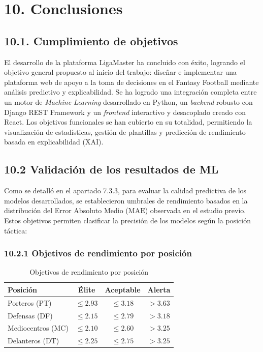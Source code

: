 \section*{10. Conclusiones}
\subsection{10.1. Cumplimiento de objetivos}

El desarrollo de la plataforma LigaMaster ha concluido con éxito,
 logrando el objetivo general propuesto al inicio del trabajo: diseñar
  e implementar una plataforma web de apoyo a la toma de decisiones en
   el Fantasy Football mediante análisis predictivo y explicabilidad. 
   Se ha logrado una integración completa entre un motor de \textit{Machine Learning}
    desarrollado en Python, un \textit{backend} robusto con Django REST Framework y
     un \textit{frontend} interactivo y desacoplado creado con React. Los objetivos 
     funcionales se han cubierto en su totalidad, permitiendo la visualización de estadísticas,
      gestión de plantillas y predicción de rendimiento basada en explicabilidad (XAI).


\subsection{10.2 Validación de los resultados de ML}

Como se detalló en el apartado 7.3.3, para evaluar la calidad 
predictiva de los modelos desarrollados, se establecieron umbrales 
de rendimiento basados en la distribución del Error Absoluto Medio 
($\mathrm{MAE}$) observada en el estudio previo. Estos objetivos 
permiten clasificar la precisión de los modelos según la posición 
táctica:


\subsubsection{10.2.1 Objetivos de rendimiento por posición}

\begin{table}[H]
\centering
\small
\begin{tabular}{|l|c|c|c|}
\hline
\textbf{Posición} & \textbf{Élite} & \textbf{Aceptable} & 
\textbf{Alerta} \\
\hline
Porteros (PT) & $\le 2.93$ & $\le 3.18$ & 
$> 3.63$ \\
Defensas (DF) & $\le 2.15$ & $\le 2.79$ & 
$> 3.18$ \\
Mediocentros (MC) & $\le 2.10$ & $\le 2.60$ & 
$> 3.25$ \\
Delanteros (DT) & $\le 2.25$ & $\le 2.75$ & 
$> 3.25$ \\
\hline
\end{tabular}
\caption{Objetivos de rendimiento por posición}
\end{table}


